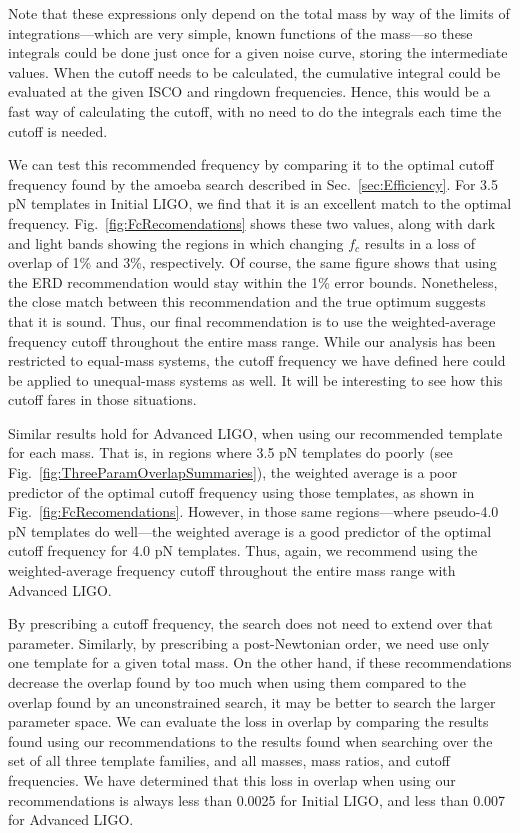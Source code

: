 Note that these expressions only depend on the total mass by way of
the limits of integrations---which are very simple, known functions of
the mass---so these integrals could be done just once for a given
noise curve, storing the intermediate values.  When the cutoff needs
to be calculated, the cumulative integral could be evaluated at the
given ISCO and ringdown frequencies.  Hence, this would be a fast way
of calculating the cutoff, with no need to do the integrals each time
the cutoff is needed.

We can test this recommended frequency by comparing it to the optimal
cutoff frequency found by the amoeba search described in
Sec.~\ref{sec:Efficiency}.  For 3.5 pN templates in Initial LIGO, we
find that it is an excellent match to the optimal frequency.
Fig.~\ref{fig:FcRecomendations} shows these two values, along with
dark and light bands showing the regions in which changing $f_{c}$
results in a loss of overlap of 1\% and 3\%, respectively.  Of course,
the same figure shows that using the ERD recommendation would stay
within the 1\% error bounds.  Nonetheless, the close match between
this recommendation and the true optimum suggests that it is sound.
Thus, our final recommendation is to use the weighted-average
frequency cutoff throughout the entire mass range.  While our analysis
has been restricted to equal-mass systems, the cutoff frequency we
have defined here could be applied to unequal-mass systems as well.
It will be interesting to see how this cutoff fares in those
situations.

Similar results hold for Advanced LIGO, when using our recommended
template for each mass.  That is, in regions where 3.5 pN templates do
poorly (see Fig.~\ref{fig:ThreeParamOverlapSummaries}), the weighted
average is a poor predictor of the optimal cutoff frequency using
those templates, as shown in Fig.~\ref{fig:FcRecomendations}.
However, in those same regions---where pseudo-4.0 pN templates do
well---the weighted average is a good predictor of the optimal cutoff
frequency for 4.0 pN templates.  Thus, again, we recommend using the
weighted-average frequency cutoff throughout the entire mass range
with Advanced LIGO.

By prescribing a cutoff frequency, the search does not need to extend
over that parameter.  Similarly, by prescribing a post-Newtonian
order, we need use only one template for a given total mass.  On the
other hand, if these recommendations decrease the overlap found by too
much when using them compared to the overlap found by an unconstrained
search, it may be better to search the larger parameter space.  We can
evaluate the loss in overlap by comparing the results found using our
recommendations to the results found when searching over the set of
all three template families, and all masses, mass ratios, and cutoff
frequencies.  We have determined that this loss in overlap when using
our recommendations is always less than 0.0025 for Initial LIGO, and
less than 0.007 for Advanced LIGO.

